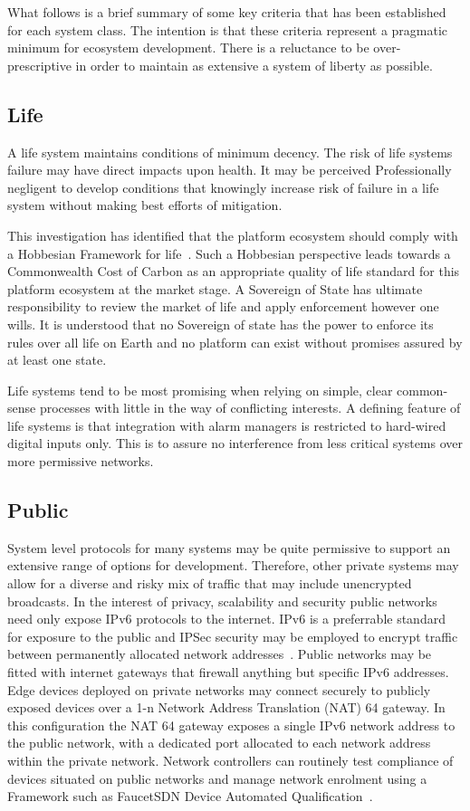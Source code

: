 \documentclass[11pt, oneside]{article}   	%
\begin{document}
\pagebreak

What follows is a brief summary of some key criteria that has been established for each system class.
The intention is that these criteria represent a pragmatic minimum for ecosystem development.
There is a reluctance to be over-prescriptive in order to maintain as extensive a system of liberty as possible.

\subsection{Life}
A life system maintains conditions of minimum decency.
The risk of life systems failure may have direct impacts upon health.
It may be perceived Professionally negligent to develop conditions that knowingly increase risk of failure in a life system without making best efforts of mitigation.\

This investigation has identified that the platform ecosystem should comply with a Hobbesian Framework for life~\cite{th1}.
Such a Hobbesian perspective leads towards a Commonwealth Cost of Carbon as an appropriate quality of life standard for this platform ecosystem at the market stage.
A Sovereign of State has ultimate responsibility to review the market of life and apply enforcement however one wills.
It is understood that no Sovereign of state has the power to enforce its rules over all life on Earth and no platform can exist without promises assured by at least one state.\

Life systems tend to be most promising when relying on simple, clear common-sense processes with little in the way of conflicting interests.
A defining feature of life systems is that integration with alarm managers is restricted to hard-wired digital inputs only.
This is to assure no interference from less critical systems over more permissive networks.\

\subsection{Public}
System level protocols for many systems may be quite permissive to support an extensive range of options for development.
Therefore, other private systems may allow for a diverse and risky mix of traffic that may include unencrypted broadcasts.
In the interest of privacy, scalability and security public networks need only expose IPv6 protocols to the internet.
IPv6 is a preferrable standard for exposure to the public and IPSec security may be employed to encrypt traffic between permanently allocated network addresses~\cite{ipv6}.
Public networks may be fitted with internet gateways that firewall anything but specific IPv6 addresses.
Edge devices deployed on private networks may connect securely to publicly exposed devices over a 1-n Network Address Translation (NAT) 64 gateway.
In this configuration the NAT 64 gateway exposes a single IPv6 network address to the public network, with a dedicated port allocated to each network address within the private network.
Network controllers can routinely test compliance of devices situated on public networks and manage network enrolment using a Framework such as FaucetSDN Device Automated Qualification~\cite{daq1}.\
\end{document}
